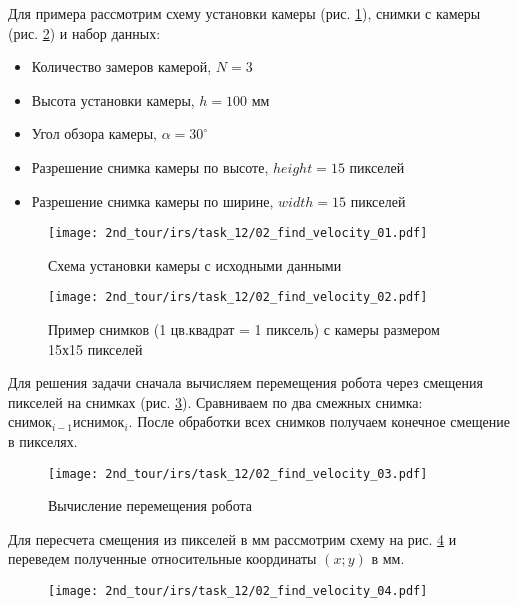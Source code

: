 \solutionSection

Для примера рассмотрим схему установки камеры (рис. \ref{fig:02_find_velocity_01}), снимки с камеры (рис. \ref{fig:02_find_velocity_02}) и набор данных:
\begin{itemize}
	\item Количество замеров камерой, $N = 3$
	\item Высота установки камеры, $h = 100$ мм
	\item Угол обзора камеры, $\alpha = 30^\circ$
	\item Разрешение снимка камеры по высоте, $height = 15$ пикселей
	\item Разрешение снимка камеры по ширине, $width = 15$ пикселей
\end{itemize}

\begin{figure}[h!]
	\centering
	\texttt{[image: 2nd\_tour/irs/task\_12/02\_find\_velocity\_01.pdf]}
	\caption{Схема установки камеры с исходными данными}
	\label{fig:02_find_velocity_01}
\end{figure}

\begin{figure}[h!]
	\centering
	\texttt{[image: 2nd\_tour/irs/task\_12/02\_find\_velocity\_02.pdf]}
	\caption{Пример снимков (1 цв.квадрат = 1 пиксель) с камеры размером 15х15 пикселей}
	\label{fig:02_find_velocity_02}
\end{figure}

Для решения задачи сначала вычисляем перемещения робота через смещения пикселей на снимках (рис. \ref{fig:02_find_velocity_03}). Сравниваем по два смежных снимка: $снимок_{i-1} и снимок_i$. После обработки всех снимков получаем конечное смещение в пикселях.

\begin{figure}[h!]
	\centering
	\texttt{[image: 2nd\_tour/irs/task\_12/02\_find\_velocity\_03.pdf]}
	\caption{Вычисление перемещения робота}
	\label{fig:02_find_velocity_03}
\end{figure}

\newpage

Для пересчета смещения из пикселей в мм рассмотрим схему на рис. \ref{fig:02_find_velocity_04} и переведем полученные относительные координаты $(x; y)$ в мм.

\begin{figure}[h!]
	\center
	\texttt{[image: 2nd\_tour/irs/task\_12/02\_find\_velocity\_04.pdf]}
	\caption{}
	\label{fig:02_find_velocity_04}
\end{figure}


